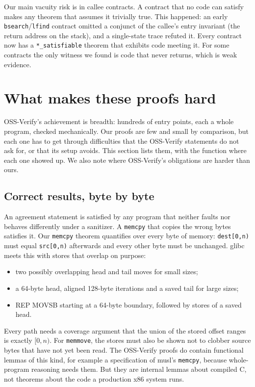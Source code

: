 \documentclass[11pt]{article}
\newcommand{\code}[1]{\texttt{#1}}
\begin{document}
Our main vacuity risk is in callee contracts.  A contract that no code can
satisfy makes any theorem that assumes it trivially true.  This happened:
an early \code{bsearch}/\code{lfind} contract omitted a conjunct of the
callee's entry invariant (the return address on the stack), and a
single-state trace refuted it.  Every contract now has a \code{*\_satisfiable}
theorem that exhibits code meeting it.  For some contracts the only witness
we found is code that never returns, which is weak evidence.

\section{What makes these proofs hard}\label{sec:hard}

OSS-Verify's achievement is breadth: hundreds of entry points, each a whole
program, checked mechanically.  Our proofs are few and small by comparison,
but each one has to get through difficulties that the OSS-Verify statements
do not ask for, or that its setup avoids.  This section lists them, with
the function where each one showed up.  We also note where OSS-Verify's
obligations are harder than ours.

\subsection{Correct results, byte by byte}

An agreement statement is satisfied by any program that neither faults nor
behaves differently under a sanitizer.  A \code{memcpy} that copies the wrong
bytes satisfies it.  Our \code{memcpy} theorem quantifies over every byte of
memory: \code{dest[0,n)} must equal \code{src[0,n)} afterwards and every
other byte must be unchanged.  glibc meets this with stores that overlap on
purpose:
\begin{itemize}[nosep]
\item two possibly overlapping head and tail moves for small sizes;
\item a 64-byte head, aligned 128-byte iterations and a saved tail for large
      sizes;
\item REP MOVSB starting at a 64-byte boundary, followed by stores of a saved
      head.
\end{itemize}
Every path needs a coverage argument that the union of the stored offset
ranges is exactly $[0,n)$.  For \code{memmove}, the stores must also be
shown not to clobber source bytes that have not yet been read.  The
OSS-Verify proofs do contain functional lemmas of this kind, for example a
specification of musl's \code{memcpy}, because whole-program reasoning needs
them.  But they are internal lemmas about compiled C, not theorems about the
code a production x86 system runs.
\end{document}
